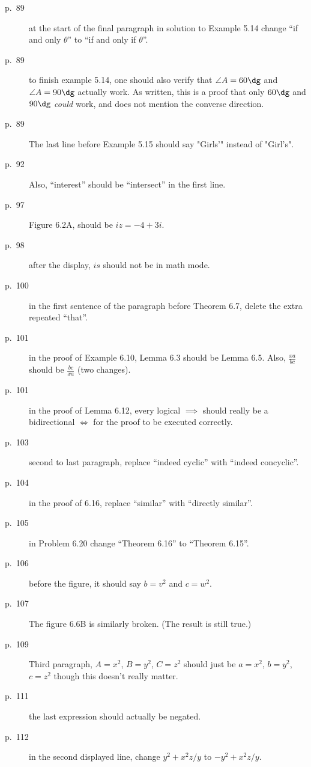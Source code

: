 \documentclass[11pt]{scrartcl}
\begin{document}
\begin{description}
\item[p.\  89] at the start of the final paragraph in solution to Example 5.14
  change ``if and only $\theta$'' to ``if and only if $\theta$''.
\item[p.\  89] to finish example 5.14, one should also verify that $\angle A = 60\dg$
  and $\angle A = 90\dg$ actually work.
  As written, this is a proof that only $60\dg$ and $90\dg$ \emph{could} work,
  and does not mention the converse direction.
\item[p.\  89] The last line before Example 5.15 should say "Girls'" instead of "Girl's".
\item[p.\  92] 
  Also, ``interest'' should be ``intersect'' in the first line.
\item[p.\  97] Figure 6.2A, should be $iz = -4+3i$.
\item[p.\  98] after the display, $is$ should not be in math mode.
\item[p.\  100] in the first sentence of the paragraph before Theorem 6.7,
  delete the extra repeated ``that''.
\item[p.\  101] in the proof of Example 6.10, Lemma 6.3 should be Lemma 6.5.
  Also, $\frac{xa}{bc}$ should be $\frac{bc}{xa}$ (two changes).
\item[p.\  101] in the proof of Lemma 6.12, every logical $\implies$ should
  really be a bidirectional $\iff$ for the proof to be executed correctly.
\item[p.\  103] second to last paragraph, replace ``indeed cyclic'' with ``indeed concyclic''.
\item[p.\  104] in the proof of 6.16, replace ``similar'' with ``directly similar''.
\item[p.\  105] in Problem 6.20 change ``Theorem 6.16'' to ``Theorem 6.15''.
\item[p.\  106] before the figure, it should say $b = v^2$ and $c = w^2$.
\item[p.\  107] 
  The figure 6.6B is similarly broken.
  (The result is still true.)
\item[p.\  109] Third paragraph, $A=x^2$, $B=y^2$, $C=z^2$
  should just be $a=x^2$, $b=y^2$, $c=z^2$ though this doesn't really matter.
\item[p.\  111] the last expression should actually be negated.
\item[p.\  112] in the second displayed line, change $y^2+x^2z/y$ to $-y^2+x^2z/y$.

\end{description}
\end{document}
